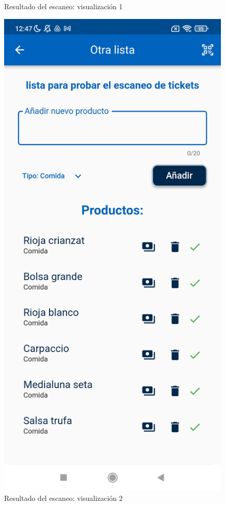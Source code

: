 \documentclass{article}
\begin{document}
\begin{figure}[h]
\begin{minipage}[h]{0.32\textwidth}
        \caption{Resultado del escaneo: visualización 1}
    \end{minipage}
    \begin{minipage}[h]{0.32\textwidth}
        \includegraphics[width=\textwidth]{imagenes/funcionamiento/ticket1_res2.jpg}
        \caption{Resultado del escaneo: visualización 2}
    \end{minipage}
\end{figure}
\end{document}
